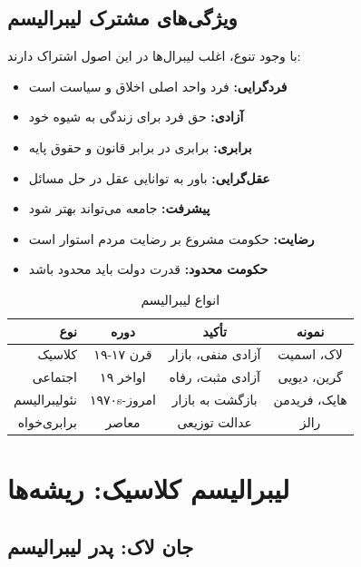 \subsection{ویژگی‌های مشترک لیبرالیسم}

\begin{defbox}
با وجود تنوع، اغلب لیبرال‌ها در این اصول اشتراک دارند:
\begin{itemize}[nosep]
    \item \textbf{فردگرایی:} فرد واحد اصلی اخلاق و سیاست است
    \item \textbf{آزادی:} حق فرد برای زندگی به شیوه خود
    \item \textbf{برابری:} برابری در برابر قانون و حقوق پایه
    \item \textbf{عقل‌گرایی:} باور به توانایی عقل در حل مسائل
    \item \textbf{پیشرفت:} جامعه می‌تواند بهتر شود
    \item \textbf{رضایت:} حکومت مشروع بر رضایت مردم استوار است
    \item \textbf{حکومت محدود:} قدرت دولت باید محدود باشد
\end{itemize}
\end{defbox}

\begin{table}[htbp]
\centering
\caption{انواع لیبرالیسم}
\label{tab:liberalism-types}
\begin{tabular}{r|c|c|c}
\toprule
\textbf{نوع} & \textbf{دوره} & \textbf{تأکید} & \textbf{نمونه} \\
\midrule
کلاسیک & قرن ۱۷-۱۹ & آزادی منفی، بازار & لاک، اسمیت \\
اجتماعی & اواخر ۱۹ & آزادی مثبت، رفاه & گرین، دیویی \\
نئولیبرالیسم & ۱۹۷۰s-امروز & بازگشت به بازار & هایک، فریدمن \\
برابری‌خواه & معاصر & عدالت توزیعی & رالز \\
\bottomrule
\end{tabular}
\end{table}

\section{لیبرالیسم کلاسیک: ریشه‌ها}

\subsection{جان لاک: پدر لیبرالیسم}

